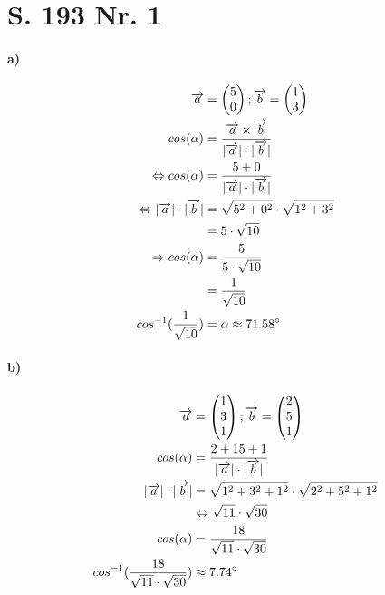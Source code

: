 \documentclass[12pt,a4paper]{report}
\newcommand{\skalar}[0]{\times}
\begin{document}
	\section{S. 193 Nr. 1}
	\paragraph{a)}
	\begin{align*}
		\overrightarrow a &= \begin{pmatrix}
			5 \\ 0
		\end{pmatrix};
		\overrightarrow b = \begin{pmatrix}
			1 \\ 3
		\end{pmatrix} \\
		cos(\alpha) &= \frac{\overrightarrow a \skalar \overrightarrow b}{|\overrightarrow a| \cdot |\overrightarrow b|} \\
		\Leftrightarrow cos(\alpha) &= \frac{5 + 0}{|\overrightarrow a| \cdot |\overrightarrow b|} \\
		\Leftrightarrow |\overrightarrow a| \cdot |\overrightarrow b| &= \sqrt{5^2 + 0^2} \cdot \sqrt{1^2 + 3^2}\\
		&= 5 \cdot \sqrt{10} \\
		\Rightarrow cos(\alpha) &= \frac{5}{5 \cdot \sqrt{10}} \\
		&= \frac{1}{\sqrt{10}} \\
		cos^{-1}(\frac{1}{\sqrt{10}}) &=\alpha \approx 71.58\degree
	\end{align*}
	\paragraph{b)}
	\begin{align*}
		\overrightarrow a &= \begin{pmatrix}
			1 \\ 3 \\ 1
		\end{pmatrix}; \overrightarrow b = \begin{pmatrix}
			2 \\ 5 \\ 1
		\end{pmatrix} \\
		cos(\alpha) &= \frac{2+15+1}{|\overrightarrow a| \cdot |\overrightarrow b|} \\
		|\overrightarrow a| \cdot |\overrightarrow b| &= \sqrt{1^2 + 3^2 + 1^2} \cdot \sqrt{2^2+5^2+1^2} \\
		&\Leftrightarrow \sqrt{11} \cdot \sqrt{30} \\
		cos(\alpha) &= \frac{18}{\sqrt{11}\cdot\sqrt{30}} \\
		cos^{-1}(\frac{18}{\sqrt{11}\cdot\sqrt{30}}) &\approx 7.74\degree
	\end{align*}
\end{document}

